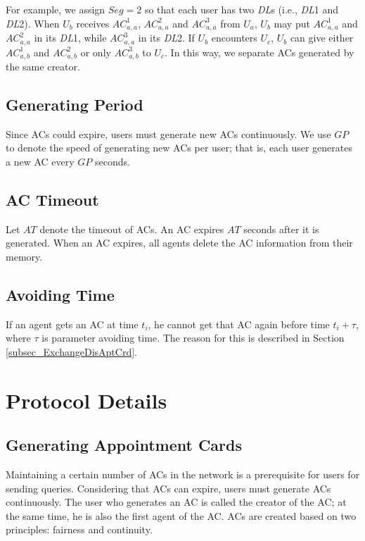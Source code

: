 For example, we assign $Seg=2$ so that each user has two \textit{DL}s (i.e., \textit{DL}1 and \textit{DL}2). When $U_b$ receives ${AC}^1_{a,a}$, ${AC}^2_{a,a}$ and ${AC}^3_{a,a}$ from $U_a$, $U_b$ may put ${AC}^1_{a,a}$ and ${AC}^2_{a,a}$ in its \textit{DL}1, while ${AC}^3_{a,a}$ in its \textit{DL}2. If $U_b$ encounters $U_c$, $U_b$ can give either ${AC}^1_{a,b}$ and ${AC}^2_{a,b}$ or only ${AC}^3_{a,b}$ to $U_c$. In this way, we separate ACs generated by the same creator.


\subsection{ Generating Period}

\noindent Since ACs could expire, users must generate new ACs continuously. We use $GP$ to denote the speed of generating new ACs per user; that is, each user generates a new AC every $GP$ seconds.


\subsection{ AC Timeout}

\noindent Let $AT$ denote the timeout of ACs. An AC expires $AT$ seconds after it is generated. When an AC expires, all agents delete the AC information from their memory.


\subsection{ Avoiding Time}

\noindent If an agent gets an AC at time $t_i$, he cannot get that AC again before time $t_i+\tau $, where $\tau$ is parameter avoiding time. The reason for this is described in Section \ref{subsec_ExchangeDisAptCrd}.


\section{ Protocol Details}


\subsection{ Generating Appointment Cards}

\noindent Maintaining a certain number of ACs in the network is a prerequisite for users for sending queries. Considering that ACs can expire, users must generate ACs continuously. The user who generates an AC is called the creator of the AC; at the same time, he is also the first agent of the AC. ACs are created based on two principles: fairness and continuity. 

